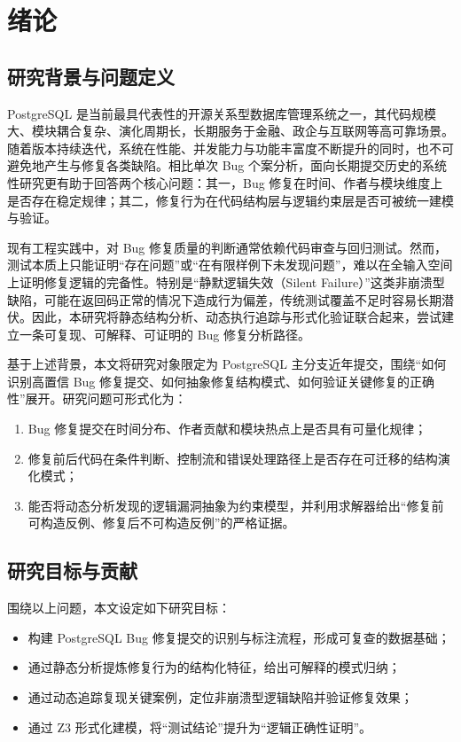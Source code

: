 \chapter{绪论}

\section{研究背景与问题定义}

PostgreSQL 是当前最具代表性的开源关系型数据库管理系统之一，其代码规模大、模块耦合复杂、演化周期长，长期服务于金融、政企与互联网等高可靠场景。随着版本持续迭代，系统在性能、并发能力与功能丰富度不断提升的同时，也不可避免地产生与修复各类缺陷。相比单次 Bug 个案分析，面向长期提交历史的系统性研究更有助于回答两个核心问题：其一，Bug 修复在时间、作者与模块维度上是否存在稳定规律；其二，修复行为在代码结构层与逻辑约束层是否可被统一建模与验证。

现有工程实践中，对 Bug 修复质量的判断通常依赖代码审查与回归测试。然而，测试本质上只能证明“存在问题”或“在有限样例下未发现问题”，难以在全输入空间上证明修复逻辑的完备性。特别是“静默逻辑失效（Silent Failure）”这类非崩溃型缺陷，可能在返回码正常的情况下造成行为偏差，传统测试覆盖不足时容易长期潜伏。因此，本研究将静态结构分析、动态执行追踪与形式化验证联合起来，尝试建立一条可复现、可解释、可证明的 Bug 修复分析路径。

基于上述背景，本文将研究对象限定为 PostgreSQL 主分支近年提交，围绕“如何识别高置信 Bug 修复提交、如何抽象修复结构模式、如何验证关键修复的正确性”展开。研究问题可形式化为：
\begin{enumerate}
  \item Bug 修复提交在时间分布、作者贡献和模块热点上是否具有可量化规律；
  \item 修复前后代码在条件判断、控制流和错误处理路径上是否存在可迁移的结构演化模式；
  \item 能否将动态分析发现的逻辑漏洞抽象为约束模型，并利用求解器给出“修复前可构造反例、修复后不可构造反例”的严格证据。
\end{enumerate}

\section{研究目标与贡献}

围绕以上问题，本文设定如下研究目标：
\begin{itemize}
  \item 构建 PostgreSQL Bug 修复提交的识别与标注流程，形成可复查的数据基础；
  \item 通过静态分析提炼修复行为的结构化特征，给出可解释的模式归纳；
  \item 通过动态追踪复现关键案例，定位非崩溃型逻辑缺陷并验证修复效果；
  \item 通过 Z3 形式化建模，将“测试结论”提升为“逻辑正确性证明”。
\end{itemize}

